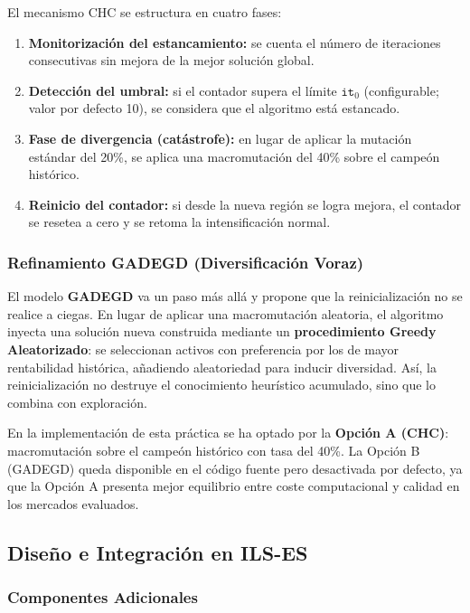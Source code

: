 El mecanismo CHC se estructura en cuatro fases:
\begin{enumerate}[noitemsep]
  \item \textbf{Monitorización del estancamiento:} se cuenta el número de iteraciones consecutivas
  sin mejora de la mejor solución global.
  \item \textbf{Detección del umbral:} si el contador supera el límite $\texttt{it}_0$
  (configurable; valor por defecto 10), se considera que el algoritmo está estancado.
  \item \textbf{Fase de divergencia (catástrofe):} en lugar de aplicar la mutación estándar del
  20\%, se aplica una macromutación del 40\% sobre el campeón histórico.
  \item \textbf{Reinicio del contador:} si desde la nueva región se logra mejora, el contador se
  resetea a cero y se retoma la intensificación normal.
\end{enumerate}

\subsubsection{Refinamiento GADEGD (Diversificación Voraz)}

El modelo \textbf{GADEGD} va un paso más allá y propone que la reinicialización no se realice a
ciegas. En lugar de aplicar una macromutación aleatoria, el algoritmo inyecta una solución nueva
construida mediante un \textbf{procedimiento Greedy Aleatorizado}: se seleccionan activos con
preferencia por los de mayor rentabilidad histórica, añadiendo aleatoriedad para inducir diversidad.
Así, la reinicialización no destruye el conocimiento heurístico acumulado, sino que lo combina con
exploración.

En la implementación de esta práctica se ha optado por la \textbf{Opción A (CHC)}: macromutación
sobre el campeón histórico con tasa del 40\%. La Opción B (GADEGD) queda disponible en el código
fuente pero desactivada por defecto, ya que la Opción A presenta mejor equilibrio entre coste
computacional y calidad en los mercados evaluados.

\subsection{Diseño e Integración en ILS-ES}

\subsubsection{Componentes Adicionales}

